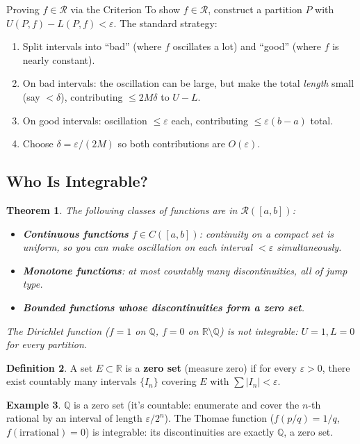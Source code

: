 \documentclass[11pt]{article}
\newcommand{\R}{\mathbb{R}}
\newcommand{\Q}{\mathbb{Q}}
\newcommand{\eps}{\varepsilon}
\theoremstyle{myplain}
\newtheorem{theorem}{Theorem}[section]
\theoremstyle{definition}
\newtheorem{definition}[theorem]{Definition}
\newtheorem{example}[theorem]{Example}
\theoremstyle{remark}
\begin{document}
\begin{technique}{Proving $f \in \mathscr{R}$ via the Criterion}
To show $f \in \mathscr{R}$, construct a partition $P$ with $U(P,f) - L(P,f) < \eps$. The standard strategy:
\begin{enumerate}
  \item Split intervals into ``bad'' (where $f$ oscillates a lot) and ``good'' (where $f$ is nearly constant).
  \item On bad intervals: the oscillation can be large, but make the total \emph{length} small (say $< \delta$), contributing $\leq 2M\delta$ to $U - L$.
  \item On good intervals: oscillation $\leq \eps$ each, contributing $\leq \eps(b-a)$ total.
  \item Choose $\delta = \eps/(2M)$ so both contributions are $O(\eps)$.
\end{enumerate}
\end{technique}

\subsection{Who Is Integrable?}

\begin{theorem}
The following classes of functions are in $\mathscr{R}([a,b])$:
\begin{itemize}
  \item \textbf{Continuous functions} $f \in C([a,b])$: continuity on a compact set is uniform, so you can make oscillation on each interval $< \eps$ simultaneously.
  \item \textbf{Monotone functions}: at most countably many discontinuities, all of jump type.
  \item \textbf{Bounded functions whose discontinuities form a zero set}.
\end{itemize}
The Dirichlet function ($f = 1$ on $\Q$, $f = 0$ on $\R \setminus \Q$) is \emph{not} integrable: $U = 1, L = 0$ for every partition.
\end{theorem}

\begin{definition}
A set $E \subset \R$ is a \textbf{zero set} (measure zero) if for every $\eps > 0$, there exist countably many intervals $\{I_n\}$ covering $E$ with $\sum |I_n| < \eps$.
\end{definition}

\begin{example}
$\Q$ is a zero set (it's countable: enumerate and cover the $n$-th rational by an interval of length $\eps/2^n$). The Thomae function ($f(p/q) = 1/q$, $f(\text{irrational}) = 0$) is integrable: its discontinuities are exactly $\Q$, a zero set.
\end{example}
\end{document}
